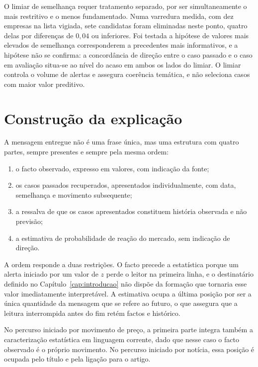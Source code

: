 O limiar de semelhança requer tratamento separado, por ser simultaneamente o mais restritivo e o
menos fundamentado. Numa varredura medida, com dez empresas na lista vigiada, sete candidatas
foram eliminadas neste ponto, quatro delas por diferenças de $0{,}04$ ou inferiores. Foi testada a
hipótese de valores mais elevados de semelhança corresponderem a precedentes mais informativos, e
a hipótese não se confirma: a concordância de direção entre o caso passado e o caso em avaliação
situa-se ao nível do acaso em ambos os lados do limiar. O limiar controla o volume de alertas e
assegura coerência temática, e não seleciona casos com maior valor preditivo.

\section{Construção da explicação}
\label{sec:sis_explicacao}

A mensagem entregue não é uma frase única, mas uma estrutura com quatro partes, sempre presentes e
sempre pela mesma ordem:

\begin{enumerate}
  \item o facto observado, expresso em valores, com indicação da fonte;
  \item os casos passados recuperados, apresentados individualmente, com data, semelhança e
        movimento subsequente;
  \item a ressalva de que os casos apresentados constituem história observada e não previsão;
  \item a estimativa de probabilidade de reação do mercado, sem indicação de direção.
\end{enumerate}

A ordem responde a duas restrições. O facto precede a estatística porque um alerta iniciado por um
valor de $z$ perde o leitor na primeira linha, e o destinatário definido no
Capítulo~\ref{cap:introducao} não dispõe da formação que tornaria esse valor imediatamente
interpretável. A estimativa ocupa a última posição por ser a única quantidade da mensagem que se
refere ao futuro, o que assegura que a leitura interrompida antes do fim retém factos e histórico.

No percurso iniciado por movimento de preço, a primeira parte integra também a caracterização
estatística em linguagem corrente, dado que nesse caso o facto observado é o próprio movimento. No
percurso iniciado por notícia, essa posição é ocupada pelo título e pela ligação para o artigo.

